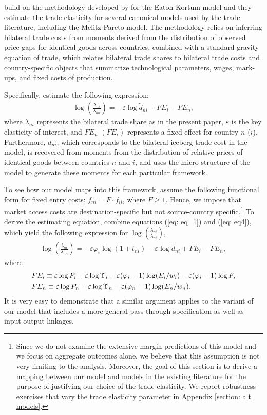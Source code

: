\documentclass[12pt]{article}
\begin{document}
\citet{NBERw20495} build on the methodology developed by \citet{simonovska2014elasticity} for the Eaton-Kortum model and they estimate the trade elasticity for several canonical models used by the trade literature, including the Melitz-Pareto model. The methodology relies on inferring bilateral trade costs from moments derived from the distribution of observed price gaps for identical goods across countries, combined with a standard gravity equation of trade, which relates bilateral trade shares to bilateral trade costs and country-specific objects that summarize technological parameters, wages, mark-ups, and fixed costs of production. 

Specifically, \citet{NBERw20495} estimate the following expression:
\begin{align}
\label{ina_mike}
\log\left(\frac{\lambda_{ni}}{\lambda_{nn}}\right)=-\varepsilon \log \tilde d_{ni} + FE_i-FE_n,
\end{align}
where $\lambda_{ni}$ represents the bilateral trade share as in the present paper, $\varepsilon$ is the key elasticity of interest, and $FE_n$ $(FE_i)$ represents a fixed effect for country $n$ ($i$). Furthermore, $\tilde d_{ni}$, which corresponds to the bilateral iceberg trade cost in the model, is recovered from moments from the distribution of relative prices of identical goods between countries $n$ and $i$, and uses the micro-structure of the model to generate these moments for each particular framework. 

To see how our model maps into this framework, assume the following functional form for fixed entry costs: $f_{ni}=F\cdot f_{ii}$, where $F\geq 1$. Hence, we impose that market access costs are destination-specific but not source-country specific.\footnote{Since we do not examine the extensive margin predictions of this model and we focus on aggregate outcomes alone, we believe that this assumption is not very limiting to the analysis. Moreover, the goal of this section is to derive a mapping between our model and models in the existing literature for the purpose of justifying our choice of the trade elasticity. We report robustness exercises that vary the trade elasticity parameter in Appendix \ref{section: alt models}.} To derive the estimating equation, combine equations (\ref{eq: eq_1}) and (\ref{eq: eq4}), which yield the following expression for
$\log\left(\frac{\lambda_{ni}}{\lambda_{ni}}\right)$,
\begin{align}
\label{ina_mike_new}
\log\left(\frac{\lambda_{ni}}{\lambda_{nn}}\right)=-\varepsilon  \varphi_i\log(1+t_{ni}) - \varepsilon \log \tilde d_{ni} + FE_i-FE_n,
\end{align}
where 
\begin{align}
    &FE_i\equiv \varepsilon\log P_i-\varepsilon\log\Upsilon_i-\varepsilon(\varphi_i-1)\log(E_i/w_i)-\varepsilon(\varphi_i-1)\log F,\notag\\
    &FE_n\equiv \varepsilon\log P_n-\varepsilon\log\Upsilon_n-\varepsilon(\varphi_n-1)\log(E_n/w_n).
\end{align}
It is very easy to demonstrate that a similar argument applies to the variant of our model that includes a more general pass-through specification as well as input-output linkages.
\end{document}
